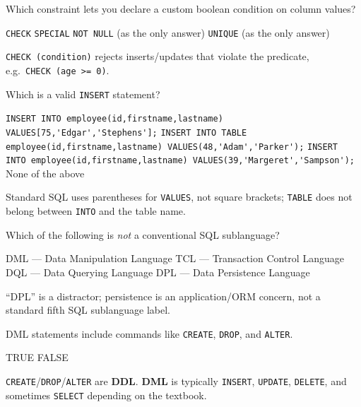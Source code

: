 \question[4]
Which constraint lets you declare a custom boolean condition on column values?
\begin{choices}
  \CorrectChoice \lstinline[style=sqlinline]!CHECK!
  \choice \texttt{SPECIAL}
  \choice \texttt{NOT NULL} (as the only answer)
  \choice \texttt{UNIQUE} (as the only answer)
\end{choices}
\begin{solution}
  \texttt{CHECK (condition)} rejects inserts/updates that violate the predicate, \\
  e.g.\ \lstinline[style=sqlinline]!CHECK (age >= 0)!.
\end{solution}

\newpage

\question[4]
Which is a valid \texttt{INSERT} statement?
\begin{choices}
  \choice \lstinline[style=sqlinline]|INSERT INTO employee(id,firstname,lastname) VALUES[75,'Edgar','Stephens'];|
  \choice \lstinline[style=sqlinline]!INSERT INTO TABLE employee(id,firstname,lastname) VALUES(48,'Adam','Parker');!
  \CorrectChoice \lstinline[style=sqlinline]!INSERT INTO employee(id,firstname,lastname) VALUES(39,'Margeret','Sampson');!
  \choice None of the above
\end{choices}
\begin{solution}
  Standard SQL uses parentheses for \texttt{VALUES}, not square brackets; \texttt{TABLE} does not belong between \texttt{INTO} and the table name.
\end{solution}

\question[4]
Which of the following is \emph{not} a conventional SQL sublanguage?
\begin{choices}
  \choice DML --- Data Manipulation Language
  \choice TCL --- Transaction Control Language
  \choice DQL --- Data Querying Language
  \CorrectChoice DPL --- Data Persistence Language
\end{choices}
\begin{solution}
  ``DPL'' is a distractor; persistence is an application/ORM concern, not a standard fifth SQL sublanguage label.
\end{solution}

\question[4]
DML statements include commands like \texttt{CREATE}, \texttt{DROP}, and \texttt{ALTER}.
\begin{choices}
  \choice TRUE
  \CorrectChoice FALSE
\end{choices}
\begin{solution}
  \texttt{CREATE}/\texttt{DROP}/\texttt{ALTER} are \textbf{DDL}. \textbf{DML} is typically \texttt{INSERT}, \texttt{UPDATE}, \texttt{DELETE}, and sometimes \texttt{SELECT} depending on the textbook.
\end{solution}

